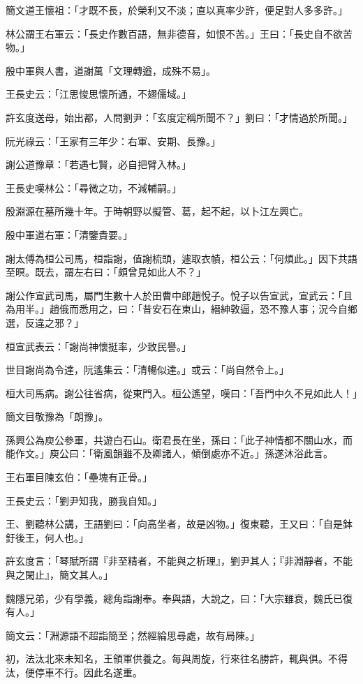 簡文道王懷祖：「才既不長，於榮利又不淡；直以真率少許，便足對人多多許。」

林公謂王右軍云：「長史作數百語，無非德音，如恨不苦。」王曰：「長史自不欲苦物。」

殷中軍與人書，道謝萬「文理轉遒，成殊不易」。

王長史云：「江思悛思懷所通，不翅儒域。」

許玄度送母，始出都，人問劉尹：「玄度定稱所聞不？」劉曰：「才情過於所聞。」

阮光祿云：「王家有三年少：右軍、安期、長豫。」

謝公道豫章：「若遇七賢，必自把臂入林。」

王長史嘆林公：「尋微之功，不減輔嗣。」

殷淵源在墓所幾十年。于時朝野以擬管、葛，起不起，以卜江左興亡。

殷中軍道右軍：「清鑒貴要。」

謝太傅為桓公司馬，桓詣謝，值謝梳頭，遽取衣幘，桓公云：「何煩此。」因下共語至暝。既去，謂左右曰：「頗曾見如此人不？」

謝公作宣武司馬，屬門生數十人於田曹中郎趙悅子。悅子以告宣武，宣武云：「且為用半。」趙俄而悉用之，曰：「昔安石在東山，縉紳敦逼，恐不豫人事；況今自鄉選，反違之邪？」

桓宣武表云：「謝尚神懷挺率，少致民譽。」

世目謝尚為令達，阮遙集云：「清暢似達。」或云：「尚自然令上。」

桓大司馬病。謝公往省病，從東門入。桓公遙望，嘆曰：「吾門中久不見如此人！」

簡文目敬豫為「朗豫」。

孫興公為庾公參軍，共遊白石山。衛君長在坐，孫曰：「此子神情都不關山水，而能作文。」庾公曰：「衛風韻雖不及卿諸人，傾倒處亦不近。」孫遂沐浴此言。

王右軍目陳玄伯：「壘塊有正骨。」

王長史云：「劉尹知我，勝我自知。」

王、劉聽林公講，王語劉曰：「向高坐者，故是凶物。」復東聽，王又曰：「自是鉢釪後王，何人也。」

許玄度言：「琴賦所謂『非至精者，不能與之析理』，劉尹其人；『非淵靜者，不能與之閑止』，簡文其人。」

魏隱兄弟，少有學義，總角詣謝奉。奉與語，大說之，曰：「大宗雖衰，魏氏已復有人。」

簡文云：「淵源語不超詣簡至；然經綸思尋處，故有局陳。」

初，法汰北來未知名，王領軍供養之。每與周旋，行來往名勝許，輒與俱。不得汰，便停車不行。因此名遂重。

